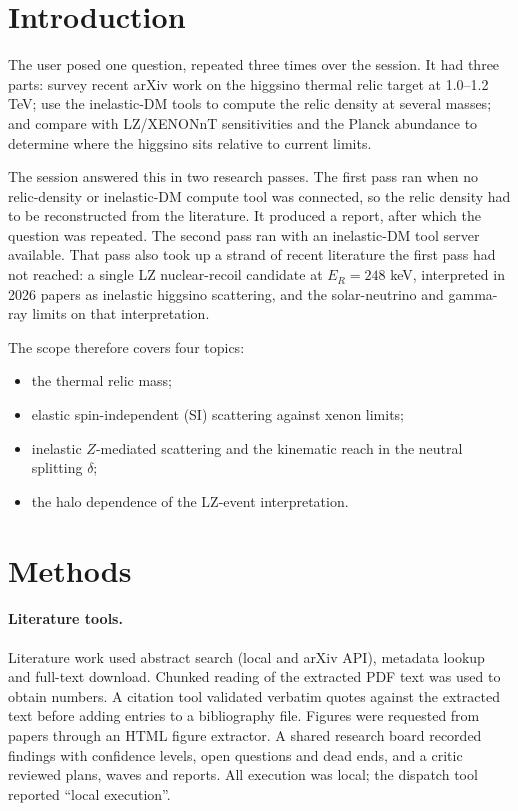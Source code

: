 \documentclass[11pt,a4paper]{article}
\begin{document}
\section{Introduction}

The user posed one question, repeated three times over the session. It had three parts: survey recent arXiv work on the higgsino thermal relic target at 1.0--1.2 TeV; use the inelastic-DM tools to compute the relic density at several masses; and compare with LZ/XENONnT sensitivities and the Planck abundance to determine where the higgsino sits relative to current limits.

The session answered this in two research passes. The first pass ran when no relic-density or inelastic-DM compute tool was connected, so the relic density had to be reconstructed from the literature. It produced a report, after which the question was repeated. The second pass ran with an inelastic-DM tool server available. That pass also took up a strand of recent literature the first pass had not reached: a single LZ nuclear-recoil candidate at $E_R=248$ keV, interpreted in 2026 papers as inelastic higgsino scattering, and the solar-neutrino and gamma-ray limits on that interpretation.

The scope therefore covers four topics:
\begin{itemize}
\item the thermal relic mass;
\item elastic spin-independent (SI) scattering against xenon limits;
\item inelastic $Z$-mediated scattering and the kinematic reach in the neutral splitting $\delta$;
\item the halo dependence of the LZ-event interpretation.
\end{itemize}

\section{Methods}

\paragraph{Literature tools.} Literature work used abstract search (local and arXiv API), metadata lookup and full-text download. Chunked reading of the extracted PDF text was used to obtain numbers. A citation tool validated verbatim quotes against the extracted text before adding entries to a bibliography file. Figures were requested from papers through an HTML figure extractor. A shared research board recorded findings with confidence levels, open questions and dead ends, and a critic reviewed plans, waves and reports. All execution was local; the dispatch tool reported ``local execution''.
\end{document}
